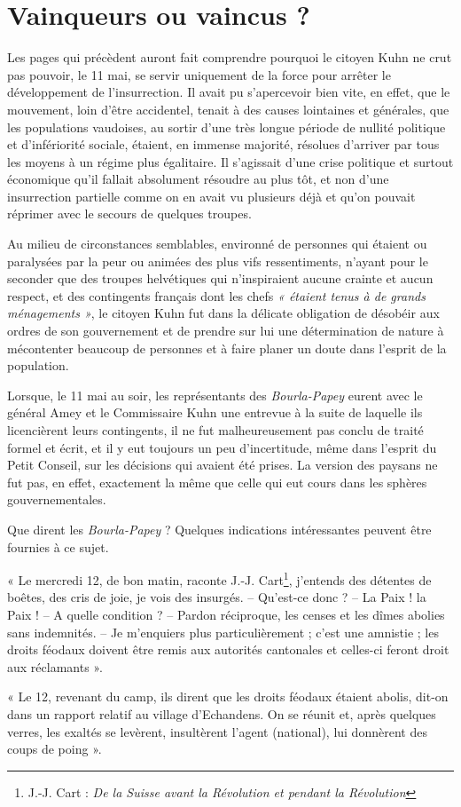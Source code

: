 \documentclass[french,twoside]{book} %
\newenvironment{quoteblock}%
  {\begin{quoting}}
  {\end{quoting}}
\newenvironment{quotebar}{%
    \def\FrameCommand{{\color{rubric!10!}\vrule width 0.5em} \hspace{0.9em}}%
    \def\OuterFrameSep{\itemsep} %
    \MakeFramed {\advance\hsize-\width \FrameRestore}
  }%
  {%
    \endMakeFramed
  }
\renewenvironment{quoteblock}%
  {%
    \savenotes
    \setstretch{0.9}
    \begin{quotebar}
  }
  {%
    \end{quotebar}
    \spewnotes
  }
\begin{document}
\section[Vainqueurs ou vaincus ?]{Vainqueurs ou vaincus ?}
\noindent Les pages qui précèdent auront fait comprendre pourquoi le citoyen Kuhn ne crut pas pouvoir, le 11 mai, se servir uniquement de la force pour arrêter le développement de l’insurrection. Il avait pu s’apercevoir bien vite, en effet, que le mouvement, loin d’être accidentel, tenait à des causes lointaines et générales, que les populations vaudoises, au sortir d’une très longue période de nullité politique et d’infériorité sociale, étaient, en immense majorité, résolues d’arriver par tous les moyens à un régime plus égalitaire. Il s’agissait d’une crise politique et surtout économique qu’il fallait absolument résoudre au plus tôt, et non d’une insurrection partielle comme on en avait vu plusieurs déjà et qu’on pouvait réprimer avec le secours de quelques troupes.\par
Au milieu de circonstances semblables, environné de personnes qui étaient ou paralysées par la peur ou animées des plus vifs ressentiments, n’ayant pour le seconder que des troupes helvétiques qui n’inspiraient aucune crainte et aucun respect, et des contingents français dont les chefs \emph{« étaient tenus à de grands ménagements »}, le citoyen Kuhn fut dans la délicate obligation de désobéir aux ordres de son gouvernement et de prendre sur lui une détermination de nature à mécontenter beaucoup de personnes et à faire planer un doute dans l’esprit de la population.\par
Lorsque, le 11 mai au soir, les représentants des \emph{Bourla-Papey} eurent avec le général Amey et le Commissaire Kuhn une entrevue à la suite de laquelle ils licencièrent leurs contingents, il ne fut malheureusement pas conclu de traité formel et écrit, et il y eut toujours un peu d’incertitude, même dans l’esprit du Petit Conseil, sur les décisions qui avaient été prises. La version des paysans ne fut pas, en effet, exactement la même que celle qui eut cours dans les sphères gouvernementales.\par
Que dirent les \emph{Bourla-Papey} ? Quelques indications intéressantes peuvent être fournies à ce sujet.\par

\begin{quoteblock}
 \noindent « Le mercredi 12, de bon matin, raconte J.-J. Cart\footnote{J.-J. Cart : \emph{De la Suisse avant la Révolution et pendant la Révolution}}, j’entends des détentes de boêtes, des cris de joie, je vois des insurgés. – Qu’est-ce donc ? – La Paix ! la Paix ! – A quelle condition ? – Pardon réciproque, les censes et les dîmes abolies sans indemnités. – Je m’enquiers plus particulièrement ; c’est une amnistie ; les droits féodaux doivent être remis aux autorités cantonales et celles-ci feront droit aux réclamants ».\par
 « Le 12, revenant du camp, ils dirent que les droits féodaux étaient abolis, dit-on dans un rapport relatif au village d’Echandens. On se réunit et, après quelques verres, les exaltés se levèrent, insultèrent l’agent (national), lui donnèrent des coups de poing ».
 \end{quoteblock}
\end{document}
